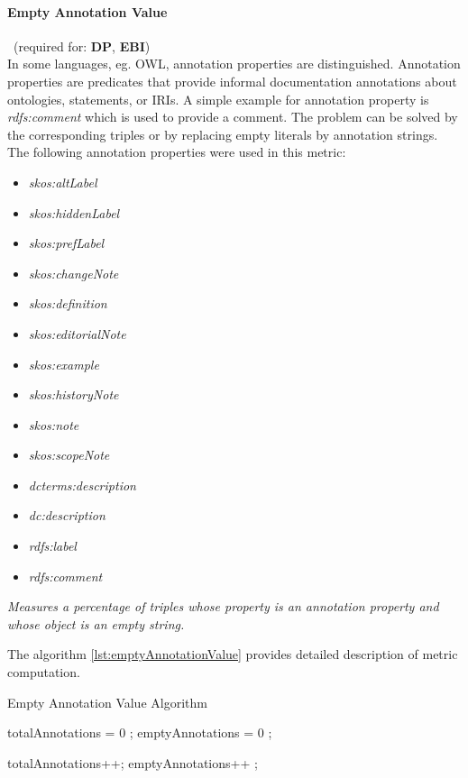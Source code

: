 \paragraph{Empty Annotation Value}~(required for: \textbf{DP}, \textbf{EBI})~\\
In some languages, eg. OWL, annotation properties are distinguished.
Annotation properties are predicates that provide informal documentation annotations about ontologies, statements, or IRIs. 
A simple example for annotation property is \textit{rdfs:comment} which is used to provide a comment. 
The problem can be solved by the corresponding triples or by replacing empty literals by annotation strings.
The following annotation properties were used in this metric:
\begin{itemize}
\item \textit{skos:altLabel}
\item \textit{skos:hiddenLabel}
\item \textit{skos:prefLabel}
\item \textit{skos:changeNote}
\item \textit{skos:definition}
\item \textit{skos:editorialNote}
\item \textit{skos:example}
\item \textit{skos:historyNote}
\item \textit{skos:note}
\item \textit{skos:scopeNote}
\item \textit{dcterms:description}
\item \textit{dc:description}
\item \textit{rdfs:label}
\item \textit{rdfs:comment}
\end{itemize}

\begin{mdframed}[style=metricdefinition]
\emph{Measures a percentage of triples whose property is an annotation property and whose object is an empty string.}

\end{mdframed}

The algorithm \ref{lst:emptyAnnotationValue} provides detailed description of metric computation. 
\begin{algorithm}
\caption{Empty Annotation Value Algorithm}\label{lst:emptyAnnotationValue}
\begin{algorithmic}[1]
\State totalAnnotations = 0 ;
\State emptyAnnotations = 0 ;
\EndProcedure

 totalAnnotations++; \EndIf
{} emptyAnnotations++ ; \EndIf
{}
\EndProcedure
\end{algorithmic}
\end{algorithm}

